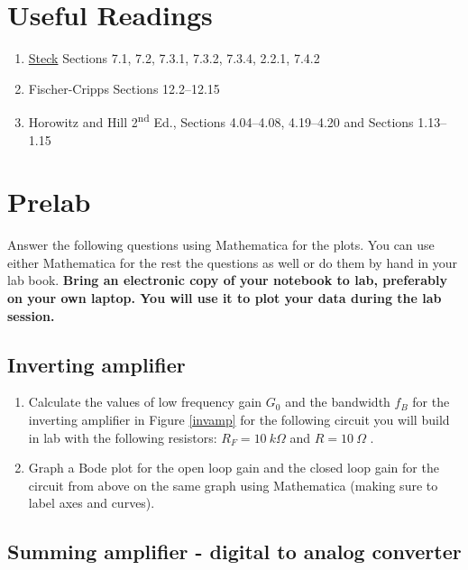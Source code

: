 \documentclass[10pt]{PhysLab1C} %
\begin{document}

\section{Useful Readings}


\begin{enumerate}
\def\labelenumi{\arabic{enumi}.}
\item
  \href{https://atomoptics-nas.uoregon.edu/~dsteck/teaching/electronics/electronics-notes.pdf}{Steck}
  Sections 7.1, 7.2, 7.3.1, 7.3.2, 7.3.4, 2.2.1, 7.4.2
\item
  Fischer-Cripps Sections 12.2--12.15
\item
  Horowitz and Hill 2\textsuperscript{nd} Ed., Sections 4.04--4.08,
  4.19--4.20 and Sections 1.13--1.15
\end{enumerate}


\section{Prelab}

Answer the following questions using Mathematica for the plots. You can
use either Mathematica for the rest the questions as well or do them by
hand in your lab book. \textbf{Bring an electronic copy of your notebook
to lab, preferably on your own laptop. You will use it to plot your data
during the lab session.}

\subsection{Inverting amplifier}


\begin{enumerate}
\def\labelenumi{\arabic{enumi}.}
\item
  Calculate the values of low frequency gain \(G_0\) and the bandwidth
  \(f_B\) for the inverting amplifier in Figure \ref{invamp} for the following
  circuit you will build in lab with the following resistors:
  \(R_F = 10 ~k\Omega\) and \(R = 10 ~\Omega\) .
\item
  Graph a Bode plot for the open loop gain and the closed loop gain for
  the circuit from above on the same graph using Mathematica (making
  sure to label axes and curves).
\end{enumerate}

\subsection{Summing amplifier - digital to analog converter}
\end{document}
